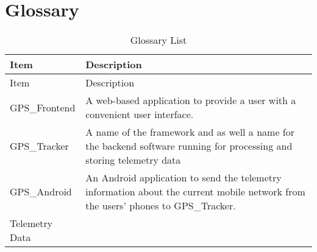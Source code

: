 \hypertarget{glossary}{%
\section{Glossary}\label{glossary}}

\begin{longtable}[]{@{}ll@{}}
\caption{Glossary List}\tabularnewline
\toprule
\begin{minipage}[b]{0.24\columnwidth}\raggedright
Item\strut
\end{minipage} & \begin{minipage}[b]{0.71\columnwidth}\raggedright
Description\strut
\end{minipage}\tabularnewline
\midrule
\endfirsthead
\toprule
\begin{minipage}[b]{0.24\columnwidth}\raggedright
Item\strut
\end{minipage} & \begin{minipage}[b]{0.71\columnwidth}\raggedright
Description\strut
\end{minipage}\tabularnewline
\midrule
\endhead
\begin{minipage}[t]{0.24\columnwidth}\raggedright
GPS\_Frontend\strut
\end{minipage} & \begin{minipage}[t]{0.71\columnwidth}\raggedright
A web-based application to provide a user with a convenient user
interface.\strut
\end{minipage}\tabularnewline
\begin{minipage}[t]{0.24\columnwidth}\raggedright
GPS\_Tracker\strut
\end{minipage} & \begin{minipage}[t]{0.71\columnwidth}\raggedright
A name of the framework and as well a name for the backend software
running for processing and storing telemetry data\strut
\end{minipage}\tabularnewline
\begin{minipage}[t]{0.24\columnwidth}\raggedright
GPS\_Android\strut
\end{minipage} & \begin{minipage}[t]{0.71\columnwidth}\raggedright
An Android application to send the telemetry information about the
current mobile network from the users' phones to GPS\_Tracker.\strut
\end{minipage}\tabularnewline
\begin{minipage}[t]{0.24\columnwidth}\raggedright
Telemetry Data\strut
\end{minipage} & \begin{minipage}[t]{0.71\columnwidth}\raggedright

\end{minipage}
\end{longtable}
